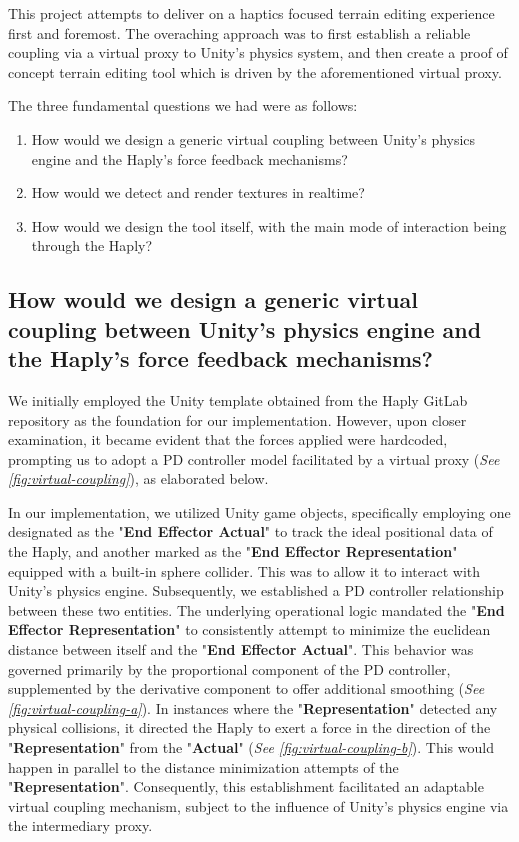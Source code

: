 This project attempts to deliver on a haptics focused terrain editing experience first and foremost. The overaching approach was to first establish a reliable coupling via a virtual proxy to Unity's physics system, and then create a proof of concept terrain editing tool which is driven by the aforementioned virtual proxy.

The three fundamental questions we had were as follows:

\begin{enumerate}
    \item How would we design a generic virtual coupling between Unity's physics engine and the Haply's force feedback mechanisms?
    \item How would we detect and render textures in realtime?
    \item How would we design the tool itself, with the main mode of interaction being through the Haply?
\end{enumerate}

\subsection{How would we design a generic virtual coupling between Unity's physics engine and the Haply's force feedback mechanisms?} \label{subsec:virtual-coupling}

We initially employed the Unity template obtained from the Haply GitLab repository as the foundation for our implementation. However, upon closer examination, it became evident that the forces applied were hardcoded, prompting us to adopt a PD controller model \cite{mathworksPID} facilitated by a virtual proxy (\textit{See \ref*{fig:virtual-coupling}}), as elaborated below.

In our implementation, we utilized Unity game objects, specifically employing one designated as the "\textbf{End Effector Actual}" to track the ideal positional data of the Haply, and another marked as the "\textbf{End Effector Representation}" equipped with a built-in sphere collider. This was to allow it to interact with Unity's physics engine. Subsequently, we established a PD controller relationship between these two entities. The underlying operational logic mandated the "\textbf{End Effector Representation}" to consistently attempt to minimize the euclidean distance between itself and the "\textbf{End Effector Actual}". This behavior was governed primarily by the proportional component of the PD controller, supplemented by the derivative component to offer additional smoothing (\textit{See \ref*{fig:virtual-coupling-a}}). In instances where the "\textbf{Representation}" detected any physical collisions, it directed the Haply to exert a force in the direction of the "\textbf{Representation}" from the "\textbf{Actual}" (\textit{See \ref*{fig:virtual-coupling-b}}). This would happen in parallel to the distance minimization attempts of the "\textbf{Representation}". Consequently, this establishment facilitated an adaptable virtual coupling mechanism, subject to the influence of Unity's physics engine via the intermediary proxy.


